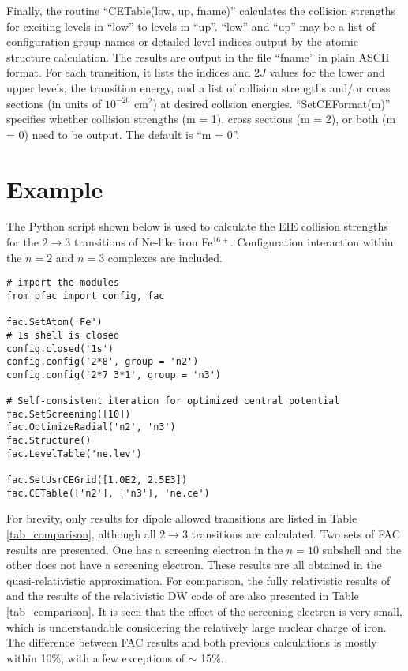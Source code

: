 \documentclass{elsart}
\begin{document}
Finally, the routine ``CETable(low, up, fname)'' calculates the collision
strengths for exciting levels in ``low'' to levels in ``up''. ``low'' and
``up'' may be a list of configuration group names or detailed level indices
output by the atomic structure calculation. The results are output in the file
``fname'' in plain ASCII format. For each transition, it lists the indices and
$2J$ values for the lower and upper levels, the transition energy, and a list
of collision strengths and/or cross sections (in units of $10^{-20}$ cm$^2$) at
desired collsion energies. ``SetCEFormat(m)'' specifies whether collision
strengths (m = 1), cross sections (m = 2), or both (m = 0) need to be
output. The default is ``m = 0''. 

\section{Example}
\label{sec_example}
The Python script shown below is used to calculate the EIE collision strengths
for the $2\to 3$ transitions of Ne-like iron Fe$^{16+}$. Configuration
interaction within the $n = 2$ and $n = 3$ complexes are included. 
\begin{verbatim}
# import the modules
from pfac import config, fac

fac.SetAtom('Fe')
# 1s shell is closed
config.closed('1s')
config.config('2*8', group = 'n2')
config.config('2*7 3*1', group = 'n3')

# Self-consistent iteration for optimized central potential
fac.SetScreening([10])
fac.OptimizeRadial('n2', 'n3')
fac.Structure()
fac.LevelTable('ne.lev')

fac.SetUsrCEGrid([1.0E2, 2.5E3])
fac.CETable(['n2'], ['n3'], 'ne.ce')
\end{verbatim}

For brevity, only results for dipole allowed transitions are listed in Table
\ref{tab_comparison}, although all $2 \to 3$ transitions are calculated. Two
sets of FAC results are presented. One has a screening electron in the $n =
10$ subshell and the other does not have a screening electron. These results
are all obtained in the quasi-relativistic approximation. For comparison, the 
fully relativistic results of \citet{zhang89} and the results of the
relativistic DW code of \citet{hagelstein87} are also presented in Table \ref{tab_comparison}. It 
is seen that the effect of the screening electron is very small, which is
understandable considering the relatively large nuclear charge of iron. 
The difference between FAC results and both previous calculations is mostly
within 10\%, with a few exceptions of $\sim$ 15\%. 
\end{document}
